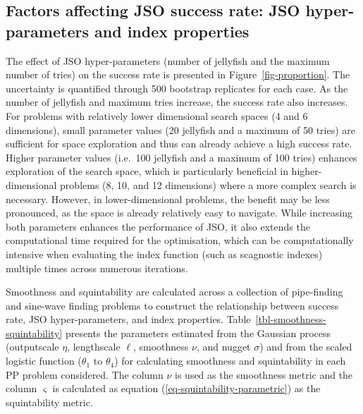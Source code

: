 \documentclass[
  12pt,
]{interact}
\theoremstyle{plain}
\begin{document}
\subsection{Factors affecting JSO success rate: JSO hyper-parameters and
index
properties}\label{factors-affecting-jso-success-rate-jso-hyper-parameters-and-index-properties}

The effect of JSO hyper-parameters (number of jellyfish and the maximum
number of tries) on the success rate is presented in
Figure~\ref{fig-proportion}. The uncertainty is quantified through 500
bootstrap replicates for each case. As the number of jellyfish and
maximum tries increase, the success rate also increases. For problems
with relatively lower dimensional search spaces (4 and 6 dimensions),
small parameter values (20 jellyfish and a maximum of 50 tries) are
sufficient for space exploration and thus can already achieve a high
success rate. Higher parameter values (i.e.~100 jellyfish and a maximum
of 100 tries) enhances exploration of the search space, which is
particularly beneficial in higher-dimensional problems (8, 10, and 12
dimensions) where a more complex search is necessary. However, in
lower-dimensional problems, the benefit may be less pronounced, as the
space is already relatively easy to navigate. While increasing both
parameters enhances the performance of JSO, it also extends the
computational time required for the optimisation, which can be
computationally intensive when evaluating the index function (such as
scagnostic indexes) multiple times across numerous iterations.

Smoothness and squintability are calculated across a collection of
pipe-finding and sine-wave finding problems to construct the
relationship between success rate, JSO hyper-parameters, and index
properties. Table~\ref{tbl-smoothness-squintability} presents the
parameters estimated from the Gaussian process (outputscale \(\eta\),
lengthscale \(\ell\), smoothness \(\nu\), and nugget \(\sigma\)) and
from the scaled logistic function (\(\theta_1\) to \(\theta_4\)) for
calculating smoothness and squintability in each PP problem considered.
The column \(\nu\) is used as the smoothness metric and the column
\(\varsigma\) is calculated as equation
(\ref{eq-squintability-parametric}) as the squintability metric.
\end{document}
